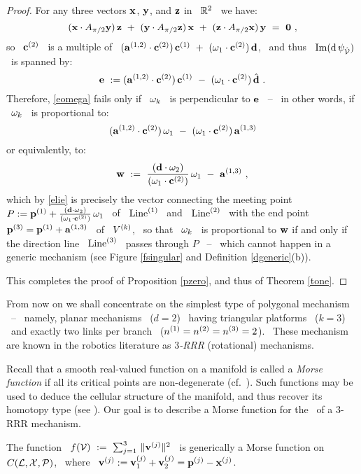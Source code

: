 \begin{proof}
For any three vectors $\mathbf{x}$, $\mathbf{y}$, and $\mathbf{z}$ in \ ${\mathbb R}^{2}$ \ we have:
%
\begin{equation}\label{elie}
%
(\bx\cdot A_{\pi/2}\by)\,\bz~+~(\by\cdot A_{\pi/2}\bz)\,\bx~+~
(\bz\cdot A_{\pi/2}\bx)\,\by~=~\vz~,
%
\end{equation}
%
\noindent so \ $\mathbf{c}\sp{({2})}$ \ is a multiple of \
$(\mathbf{a}\sp{({1,2})}\cdot\mathbf{c}\sp{({2})})\,\mathbf{c}\sp{({1})}~+~(\mathbf{\omega}_{1}\cdot\mathbf{c}\sp{({2})})\,\mathbf{d}$, \ and thus \
$\operatorname{Im}(\operatorname{d}\psi_{\hat{\mathcal{V}}})$ \ is spanned by:
$$
\mathbf{e}~:=(\mathbf{a}\sp{({1,2})}\cdot\mathbf{c}\sp{({2})})\,\mathbf{c}\sp{({1})}~-~(\mathbf{\omega}_{1}\cdot\mathbf{c}\sp{({2})})\,\hat{\mathbf{d}}~.
$$
%
Therefore, \eqref{eomega} fails only if \ $\mathbf{\omega}_{k}$ \ is perpendicular to
$\mathbf{e}$ \ -- \ in other words, if \ $\mathbf{\omega}_{k}$ \ is proportional to:
$$
(\mathbf{a}\sp{({1,2})}\cdot\mathbf{c}\sp{({2})})\,\mathbf{\omega}_{1}~-~(\mathbf{\omega}_{1}\cdot\mathbf{c}\sp{({2})})\,\mathbf{a}\sp{({1,3})}
$$
%
or equivalently, to:
$$
\mathbf{w}~:=~\frac{(\mathbf{d}\cdot\mathbf{\omega}_{2})}{(\mathbf{\omega}_{1}\cdot\mathbf{c}\sp{({2})})}\,\mathbf{\omega}_{1}~-~\mathbf{a}\sp{({1,3})}~,
$$
%
which by \eqref{elie} is precisely the vector connecting the meeting
point \ $P:=\mathbf{p}\sp{({1})}+\frac{(\mathbf{d}\cdot\mathbf{\omega}_{2})}{(\mathbf{\omega}_{1}\cdot\mathbf{c}\sp{({2})})}\,\mathbf{\omega}_{1}$ \ of \
$\operatorname{Line}\sp{({1})}$ \ and \ $\operatorname{Line}\sp{({2})}$ \ with the end point \
$\mathbf{p}\sp{({3})}=\mathbf{p}\sp{({1})}+\mathbf{a}\sp{({1,3})}$ \ of \ $V\sp{({k})}$, \ so that \ $\mathbf{\omega}_{k}$ \ is
proportional to $\mathbf{w}$ if and only if the direction line \
$\operatorname{Line}\sp{({3})}$ \ passes through $P$ \ -- \ which cannot happen in a
generic mechanism (see Figure \ref{fsingular} and
Definition \ref{dgeneric}(b)).

This completes the proof of Proposition \ref{pzero}, and thus of
Theorem \ref{tone}.
%
\end{proof}

%
%
 \label{cplan}
%
From now on we shall concentrate on the simplest type of polygonal
mechanism \ -- \ namely, planar mechanisms \ ($d=2$) \ having
triangular platforms \ ($k=3$) \ and exactly two links per branch \
($n\sp{({1})}=n\sp{({2})}=n\sp{({3})}=2$). \ These mechanism are known in the
robotics literature as \emph{$3$-RRR} (rotational) mechanisms.

Recall that a smooth real-valued function on a manifold is
called a \emph{Morse function} if all its critical points are
non-degenerate (cf.\ \cite[I, \S 2]{Mi}). Such functions may be used to
deduce the cellular structure of the manifold, and thus recover its
homotopy type  (see \cite[I, \S 3]{Mi}). Our goal is to describe a
Morse function for the \cspace\ of a $3$-RRR mechanism\vsm.

\begin{thm}\label{ttwo}
%
The function \ $f(\mathcal{V})~:=~\sum_{j=1}^{3}\,\|\mathbf{v}\sp{({j})}\|^{2}$ \ is
generically a Morse function on \ $C(\mathcal{L},\mathcal{X},\mathcal{P})$, \
where \ $\mathbf{v}\sp{({j})}:=\mathbf{v}\sp{({j})}_{1}+\mathbf{v}\sp{({j})}_{2}=\mathbf{p}\sp{({j})}-\mathbf{x}\sp{({j})}$.
%
\end{thm}

